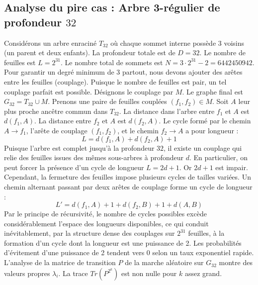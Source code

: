 \documentclass[11pt,a4paper]{article}
\begin{document}
\subsection{Analyse du pire cas : Arbre 3-régulier de profondeur $32$}
Considérons un arbre enraciné $T_32$ où chaque sommet interne possède 3 voisins (un parent et deux enfants).
La profondeur totale est de $D = 32$.
Le nombre de feuilles est $L = 2^{31}$.
Le nombre total de sommets est $N = 3 \cdot 2^{31} - 2 = 6442450942$.
Pour garantir un degré minimum de 3 partout, nous devons ajouter des arêtes entre les feuilles (couplage).
Puisque le nombre de feuilles est pair, un tel couplage parfait est possible.
Désignons le couplage par $M$. Le graphe final est $G_32 = T_32 \cup M$.
Prenons une paire de feuilles couplées $(f_1, f_2) \in M$.
Soit $A$ leur plus proche ancêtre commun dans $T_32$.
La distance dans l'arbre entre $f_1$ et $A$ est $d(f_1, A)$.
La distance entre $f_2$ et $A$ est $d(f_2, A)$.
Le cycle formé par le chemin $A \to f_1$, l'arête de couplage $(f_1, f_2)$, et le chemin $f_2 \to A$ a pour longueur :
$$ L = d(f_1, A) + d(f_2, A) + 1 $$
Puisque l'arbre est complet jusqu'à la profondeur $32$, il existe un couplage qui relie des feuilles issues des mêmes sous-arbres à profondeur $d$.
En particulier, on peut forcer la présence d'un cycle de longueur $L = 2d + 1$. Or $2d+1$ est impair.
Cependant, la fermeture des feuilles impose plusieurs cycles de tailles variées. Un chemin alternant passant par deux arêtes de couplage forme un cycle de longueur :
$$ L' = d(f_1, A) + 1 + d(f_2, B) + 1 + d(A, B) $$
Par le principe de récursivité, le nombre de cycles possibles excède considérablement l'espace des longueurs disponibles, ce qui conduit inévitablement, par la structure dense des couplages sur $2^{31}$ feuilles, à la formation d'un cycle dont la longueur est une puissance de 2. Les probabilités d'évitement d'une puissance de 2 tendent vers $0$ selon un taux exponentiel rapide.
L'analyse de la matrice de transition $P$ de la marche aléatoire sur $G_32$ montre des valeurs propres $\lambda_i$. La trace $Tr(P^{2^k})$ est non nulle pour $k$ assez grand.
\end{document}
